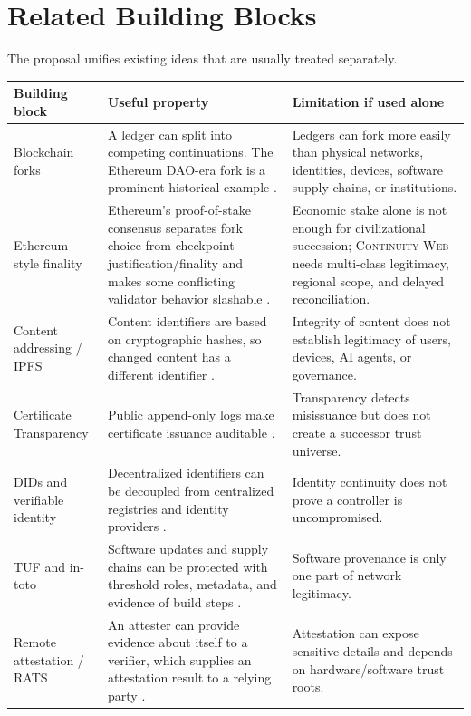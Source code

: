 \documentclass[11pt,letterpaper]{article}
\newcommand{\CW}{\textsc{Continuity Web}}
\begin{document}
\section{Related Building Blocks}

The proposal unifies existing ideas that are usually treated separately.

\begin{longtable}{p{}p{}p{}}
\toprule
\textbf{Building block} & \textbf{Useful property} & \textbf{Limitation if used alone} \\
\midrule
Blockchain forks & A ledger can split into competing continuations. The Ethereum DAO-era fork is a prominent historical example \cite{ethereum_forks}. & Ledgers can fork more easily than physical networks, identities, devices, software supply chains, or institutions. \\
\addlinespace
Ethereum-style finality & Ethereum's proof-of-stake consensus separates fork choice from checkpoint justification/finality and makes some conflicting validator behavior slashable \cite{ethereum_gasper,ethereum_slashing}. & Economic stake alone is not enough for civilizational succession; \CW{} needs multi-class legitimacy, regional scope, and delayed reconciliation. \\
\addlinespace
Content addressing / IPFS & Content identifiers are based on cryptographic hashes, so changed content has a different identifier \cite{ipfs_cid}. & Integrity of content does not establish legitimacy of users, devices, AI agents, or governance. \\
\addlinespace
Certificate Transparency & Public append-only logs make certificate issuance auditable \cite{ct}. & Transparency detects misissuance but does not create a successor trust universe. \\
\addlinespace
DIDs and verifiable identity & Decentralized identifiers can be decoupled from centralized registries and identity providers \cite{did}. & Identity continuity does not prove a controller is uncompromised. \\
\addlinespace
TUF and in-toto & Software updates and supply chains can be protected with threshold roles, metadata, and evidence of build steps \cite{tuf,tuf_spec,intoto}. & Software provenance is only one part of network legitimacy. \\
\addlinespace
Remote attestation / RATS & An attester can provide evidence about itself to a verifier, which supplies an attestation result to a relying party \cite{rfc9334}. & Attestation can expose sensitive details and depends on hardware/software trust roots. \\

\end{longtable}
\end{document}
